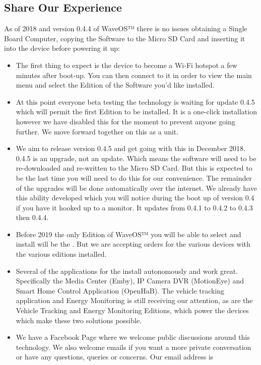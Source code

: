 \documentclass[letterpaper,10pt,english]{sphinxmanual}
\begin{document}
\subsection{Share Our Experience}
\label{\detokenize{preperation:share-our-experience}}
As of 2018 and version 0.4.4 of WaveOS™ there is no issues obtaining a Single Board Computer, copying the Software to the Micro SD Card and inserting it into the device before powering it up:
\begin{itemize}
\item {} 
The first thing to expect is the device to become a Wi-Fi hotspot a few minutes after boot-up. You can then connect to it in order to view the main menu and select the Edition of the Software you’d like installed.

\item {} 
At this point everyone beta testing the technology is waiting for update 0.4.5 which will permit the first Edition to be installed. It is a one-click installation however we have disabled this for the moment to prevent anyone going further. We move forward together on this as a unit.

\item {} 
We aim to release version 0.4.5 and get going with this in December 2018. 0.4.5 is an upgrade, not an update. Which means the software will need to be re-downloaded and re-written to the Micro SD Card. But this is expected to be the last time you will need to do this for our convenience. The remainder of the upgrades will be done automatically over the internet. We already have this ability developed which you will notice during the boot up of version 0.4 if you have it hooked up to a monitor. It updates from 0.4.1 to 0.4.2 to 0.4.3 then 0.4.4.

\item {} 
Before 2019 the only Edition of WaveOS™ you will be able to select and install will be the . But we are accepting orders for the various devices with the various editions installed.

\item {} 
Several of the applications for the  install autonomously and work great. Specifically the Media Center (Emby), IP Camera DVR (MotionEye) and Smart Home Control Application (OpenHaB). The vehicle tracking application and Energy Monitoring is still receiving our attention, as are the Vehicle Tracking and Energy Monitoring Editions, which power the devices which make these two solutions possible.

\item {} 
We have a Facebook Page where we welcome public discussions around this technology. We also welcome emails if you want a more private conversation or have any questions, queries or concerns. Our email address is 

\end{itemize}
\end{document}
